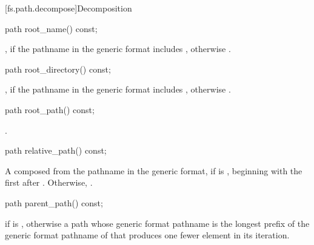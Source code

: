 [fs.path.decompose]{Decomposition}

%
\begin{itemdecl}
path root_name() const;
\end{itemdecl}

\begin{itemdescr}
\pnum
\returns
{}, if the pathname in the generic format
includes , otherwise .
\end{itemdescr}

%
\begin{itemdecl}
path root_directory() const;
\end{itemdecl}

\begin{itemdescr}
\pnum
\returns
{}, if the pathname in the generic format
includes , otherwise .
\end{itemdescr}

%
\begin{itemdecl}
path root_path() const;
\end{itemdecl}

\begin{itemdescr}
\pnum
\returns
{}.
\end{itemdescr}

%
\begin{itemdecl}
path relative_path() const;
\end{itemdecl}

\begin{itemdescr}
\pnum
\returns
A  composed from the pathname in the generic format,
if  is , beginning
with the first  after . Otherwise, .
\end{itemdescr}

%
\begin{itemdecl}
path parent_path() const;
\end{itemdecl}

\begin{itemdescr}
\pnum
\returns
{} if  is ,
otherwise a path whose generic format pathname is
the longest prefix of the generic format pathname of 
that produces one fewer element in its iteration.
\end{itemdescr}

